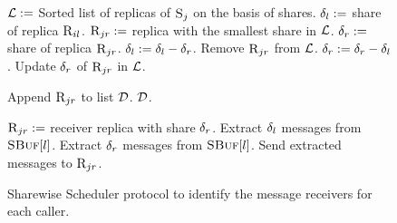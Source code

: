 \begin{itemize}[wide]


\begin{figure}[t]
    \begin{myprotocol}
	\vspace{1mm}

		\STATE $\mathcal{L} :=$ Sorted list of replicas of $\textsc{S}_{j}$ on the basis of shares.
			\STATE ${\delta}_{l} :=$ share of replica $\textsc{R}_{{i}{l}}$.
				\STATE $\textsc{R}_{{j}{r}} :=$ replica with the smallest share in $\mathcal{L}$.
				\STATE ${\delta}_{r} :=$ share of replica $\textsc{R}_{{j}{r}}$.
					\STATE ${\delta}_{l} := {\delta}_{l} - {\delta}_{r}$.
					\STATE Remove $\textsc{R}_{{j}{r}}$ from $\mathcal{L}$.
				\ELSE
					\STATE ${\delta}_{r} := {\delta}_{r} - {\delta}_{l}$.
					\STATE Update ${\delta}_{r}$ of $\textsc{R}_{{j}{r}}$ in $\mathcal{L}$.
				\ENDIF

					\STATE Append $\textsc{R}_{{j}{r}}$ to list $\mathcal{D}$.
				\ENDIF
			\ENDWHILE
		\ENDFOR
		 $\mathcal{D}$.
	\ENDFUNC
	\SPACE

			\STATE $\textsc{R}_{{j}{r}} :=$ receiver replica with share ${\delta}_{r}$.
				\STATE Extract ${\delta}_{l}$ messages from $\textsc{SBuf}[{l}]$.
			\ELSE
				\STATE Extract ${\delta}_{r}$ messages from $\textsc{SBuf}[{l}]$.
			\ENDIF
			\STATE Send extracted messages to $\textsc{R}_{{j}{r}}$.
		\ENDFOR
	\ENDFUNC
    \end{myprotocol}
    \caption{Sharewise Scheduler protocol to identify the message receivers for each caller.}
    \label{func:sws}
\end{figure}



\end{itemize}
